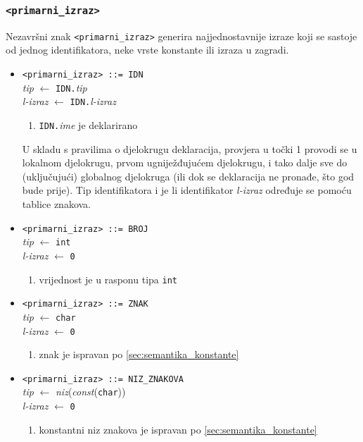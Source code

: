 \documentclass[times, 12pt, utf8]{book}
\begin{document}
\subsubsection{\texttt{<primarni\_izraz>}}

Nezavršni znak \verb|<primarni_izraz>| generira najjednostavnije izraze koji se sastoje od jednog identifikatora, neke vrste konstante ili izraza u zagradi.

\begin{itemize}

\item
\verb|<primarni_izraz> ::= IDN|\\
\emph{tip} \(\leftarrow\) \verb|IDN.|\emph{tip}\\
\emph{l-izraz} \(\leftarrow\) \verb|IDN.|\emph{l-izraz}
\begin{enumerate}
\item
\verb|IDN.|\emph{ime} je deklarirano
\end{enumerate}

U skladu s pravilima o djelokrugu deklaracija, provjera u točki 1 provodi se u lokalnom djelokrugu, prvom ugniježđujućem djelokrugu, i tako dalje sve do (uključujući) globalnog djelokruga (ili dok se deklaracija ne pronađe, što god bude prije).
Tip identifikatora i je li identifikator \emph{l-izraz} određuje se pomoću tablice znakova.

\item
\verb|<primarni_izraz> ::= BROJ|\\
\emph{tip} \(\leftarrow\) \verb|int|\\
\emph{l-izraz} \(\leftarrow\) \verb|0|
\begin{enumerate}
\item
vrijednost je u rasponu tipa \verb|int|
\end{enumerate}

\item
\verb|<primarni_izraz> ::= ZNAK|\\
\emph{tip} \(\leftarrow\) \verb|char|\\
\emph{l-izraz} \(\leftarrow\) \verb|0|
\begin{enumerate}
\item
znak je ispravan po \ref{sec:semantika_konstante}
\end{enumerate}

\item
\verb|<primarni_izraz> ::= NIZ_ZNAKOVA|\\
\emph{tip} \(\leftarrow\) \emph{niz}(\emph{const}(\verb|char|))\\
\emph{l-izraz} \(\leftarrow\) \verb|0|
\begin{enumerate}
\item
konstantni niz znakova je ispravan po \ref{sec:semantika_konstante}
\end{enumerate}


\end{itemize}
\end{document}
